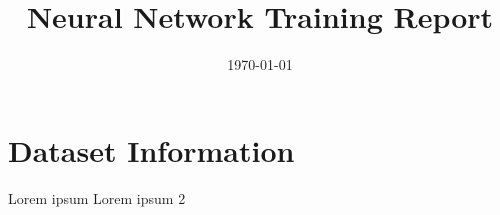 \documentclass{article}%
\title{Neural Network Training Report}%
\date{\today}%
\begin{document}
%
\normalsize%
\maketitle%
\section{Dataset Information}%
\label{sec:DatasetInformation}%
Lorem ipsum\newline%
        Lorem ipsum 2\newline%
        

%
\end{document}
